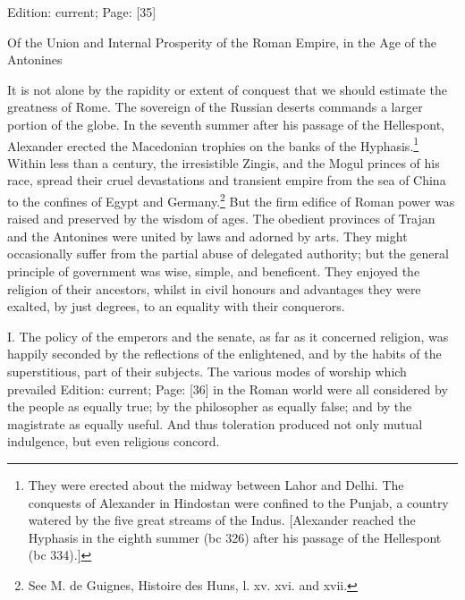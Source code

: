 Edition: current; Page: [35]


Of the Union and Internal Prosperity of the Roman Empire, in the Age of the Antonines

It is not alone by the rapidity or extent of conquest that we should estimate the greatness of Rome. The sovereign of the Russian deserts commands a larger portion of the globe. In the seventh summer after his passage of the Hellespont, Alexander erected the Macedonian trophies on the banks of the Hyphasis.\footnote{They were erected about the midway between Lahor and Delhi. The conquests of Alexander in Hindostan were confined to the Punjab, a country watered by the five great streams of the Indus. [Alexander reached the Hyphasis in the eighth summer (bc 326) after his passage of the Hellespont (bc 334).]} Within less than a century, the irresistible Zingis, and the Mogul princes of his race, spread their cruel devastations and transient empire from the sea of China to the confines of Egypt and Germany.\footnote{See M. de Guignes, Histoire des Huns, l. xv. xvi. and xvii.} But the firm edifice of Roman power was raised and preserved by the wisdom of ages. The obedient provinces of Trajan and the Antonines were united by laws and adorned by arts. They might occasionally suffer from the partial abuse of delegated authority; but the general principle of government was wise, simple, and beneficent. They enjoyed the religion of their ancestors, whilst in civil honours and advantages they were exalted, by just degrees, to an equality with their conquerors.

I. The policy of the emperors and the senate, as far as it concerned religion, was happily seconded by the reflections of the enlightened, and by the habits of the superstitious, part of their subjects. The various modes of worship which prevailed Edition: current; Page: [36] in the Roman world were all considered by the people as equally true; by the philosopher as equally false; and by the magistrate as equally useful. And thus toleration produced not only mutual indulgence, but even religious concord.

